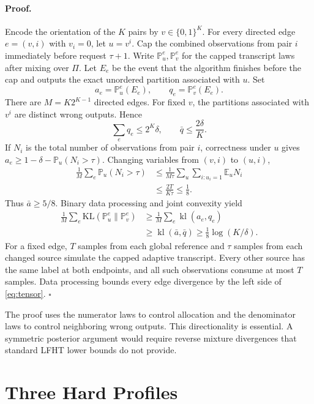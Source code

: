 \documentclass[twoside]{article}
\newcommand{\E}{\mathbb E}
\newcommand{\Pp}{\mathbb P}
\newcommand{\KL}{\mathrm{KL}}
\begin{document}
\paragraph{Proof.} Encode the orientation of the $K$ pairs by $v\in\{0,1\}^K$. For every directed edge $e=(v,i)$ with $v_i=0$, let $u=v^i$. Cap the combined observations from pair $i$ immediately before request $\tau+1$. Write $\Pp_u^e,\Pp_v^e$ for the capped transcript laws after mixing over $\Pi$. Let $E_e$ be the event that the algorithm finishes before the cap and outputs the exact unordered partition associated with $u$. Set
\[
a_e=\Pp_u^e(E_e),\qquad q_e=\Pp_v^e(E_e).
\]
There are $M=K2^{K-1}$ directed edges. For fixed $v$, the partitions associated with $v^i$ are distinct wrong outputs. Hence
\begin{equation}
\sum_e q_e\leq2^K\delta,\qquad \bar q\leq\frac{2\delta}{K}.
\label{eq:qbar}
\end{equation}
If $N_i$ is the total number of observations from pair $i$, correctness under $u$ gives $a_e\geq1-\delta-\Pp_u(N_i>\tau)$. Changing variables from $(v,i)$ to $(u,i)$,
\begin{align}
\frac1M\sum_e\Pp_u(N_i>\tau)
&\leq\frac{1}{M\tau}\sum_u\sum_{i:u_i=1}\E_uN_i\\
&\leq\frac{2T}{K\tau}\leq\frac18.
\label{eq:capaverage}
\end{align}
Thus $\bar a\geq5/8$. Binary data processing and joint convexity yield
\begin{align}
\frac1M\sum_e\KL(\Pp_u^e\|\Pp_v^e)
&\geq\frac1M\sum_e\operatorname{kl}(a_e,q_e)\\
&\geq\operatorname{kl}(\bar a,\bar q)
\geq\frac18\log(K/\delta).
\label{eq:binarykl}
\end{align}
For a fixed edge, $T$ samples from each global reference and $\tau$ samples from each changed source simulate the capped adaptive transcript. Every other source has the same label at both endpoints, and all such observations consume at most $T$ samples. Data processing bounds every edge divergence by the left side of \eqref{eq:tensor}. \hfill$\square$

The proof uses the numerator laws to control allocation and the denominator laws to control neighboring wrong outputs. This directionality is essential. A symmetric posterior argument would require reverse mixture divergences that standard LFHT lower bounds do not provide.

\section{Three Hard Profiles}
\end{document}
